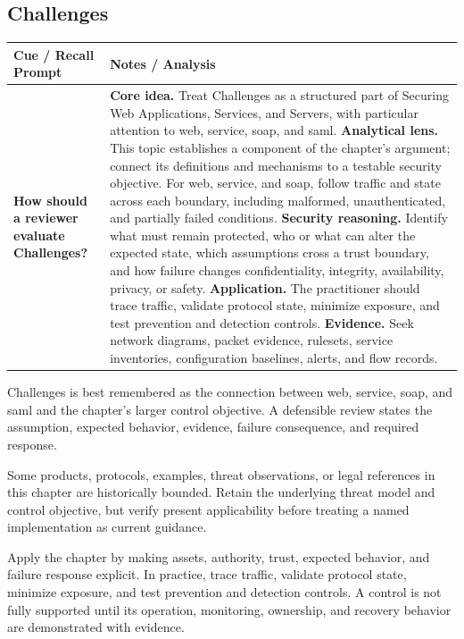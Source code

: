 \documentclass[11pt]{article}
\newcommand{\CornellHeader}{%
\rowcolor{Navy}\color{white}\bfseries Cue / Recall Prompt & \color{white}\bfseries Notes / Analysis\\\hline}
\newcommand{\CornellRow}[2]{%
\cellcolor{CueGray}\RaggedRight\textbf{#1} & \RaggedRight #2\\\hline}
\begin{document}
\subsection*{Challenges}
\begin{longtable}{>{\RaggedRight\arraybackslash}p{}|>{\RaggedRight\arraybackslash}p{}}
\CornellHeader
\CornellRow{How should a reviewer evaluate Challenges?}{\textbf{Core idea.} Treat Challenges as a structured part of Securing Web Applications, Services, and Servers, with particular attention to web, service, soap, and saml. \textbf{Analytical lens.} This topic establishes a component of the chapter's argument; connect its definitions and mechanisms to a testable security objective. For web, service, and soap, follow traffic and state across each boundary, including malformed, unauthenticated, and partially failed conditions. \textbf{Security reasoning.} Identify what must remain protected, who or what can alter the expected state, which assumptions cross a trust boundary, and how failure changes confidentiality, integrity, availability, privacy, or safety. \textbf{Application.} The practitioner should trace traffic, validate protocol state, minimize exposure, and test prevention and detection controls. \textbf{Evidence.} Seek network diagrams, packet evidence, rulesets, service inventories, configuration baselines, alerts, and flow records.}
\end{longtable}
\begin{topicsummary}
Challenges is best remembered as the connection between web, service, soap, and saml and the chapter's larger control objective. A defensible review states the assumption, expected behavior, evidence, failure consequence, and required response.
\end{topicsummary}
\begin{historybox}
Some products, protocols, examples, threat observations, or legal references in this chapter are historically bounded. Retain the underlying threat model and control objective, but verify present applicability before treating a named implementation as current guidance.
\end{historybox}
\begin{defensebox}
Apply the chapter by making assets, authority, trust, expected behavior, and failure response explicit. In practice, trace traffic, validate protocol state, minimize exposure, and test prevention and detection controls. A control is not fully supported until its operation, monitoring, ownership, and recovery behavior are demonstrated with evidence.
\end{defensebox}
\end{document}
